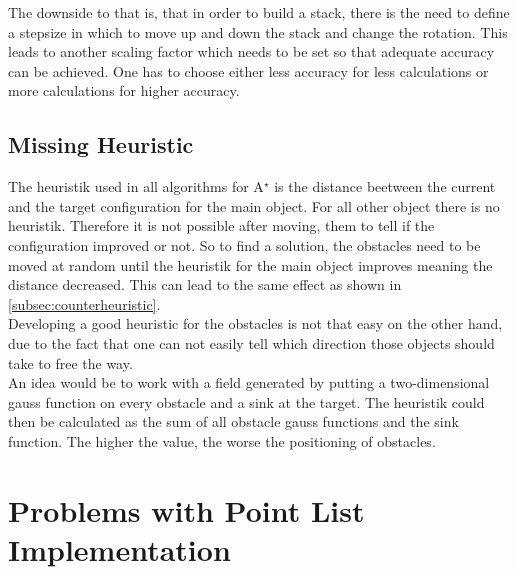 The downside to that is, that in order to build a stack, there is the need to define a stepsize in which to move up and down the stack and change the rotation. This leads to another scaling factor which needs to be set so that adequate accuracy can be achieved. One has to choose either less accuracy for less calculations or more calculations for higher accuracy.

\subsection{Missing Heuristic}
The heuristik used in all algorithms for A$^\star$ is the distance beetween the current and the target configuration for the main object. For all other object there is no heuristik. Therefore it is not possible after moving, them to tell if the configuration improved or not. So to find a solution, the obstacles need to be moved at random until the heuristik for the main object improves meaning the distance decreased. This can lead to the same effect as shown in \ref{subsec:counterheuristic}.\\
Developing a good heuristic for the obstacles is not that easy on the other hand, due to the fact that one can not easily tell which direction those objects should take to free the way.\\
An idea would be to work with a field generated by putting a two-dimensional gauss function on every obstacle and a sink at the target. The heuristik could then be calculated as the sum of all obstacle gauss functions and the sink function. The higher the value, the worse the positioning of obstacles. 

\section{Problems with Point List Implementation}
